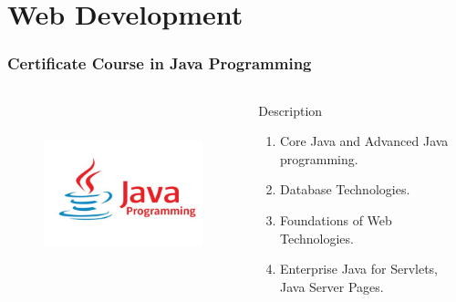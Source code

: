 \section{Web Development}
\begin{frame}
	\frametitle{Certificate Course in Java Programming}
	\begin{columns}
	
	\begin{figure}
		\includegraphics[width=180pt,height=150pt]{figures/course_jp.jpg}
	\end{figure}
	
	
	\begin{block}{Description}
		
		\begin{enumerate}
			\item Core Java and Advanced Java programming. 
			\item Database Technologies.
			\item Foundations of Web Technologies.
			\item Enterprise Java for Servlets, Java Server Pages.
		\end{enumerate}
		
	\end{block}
	
\end{columns}
\end{frame}


